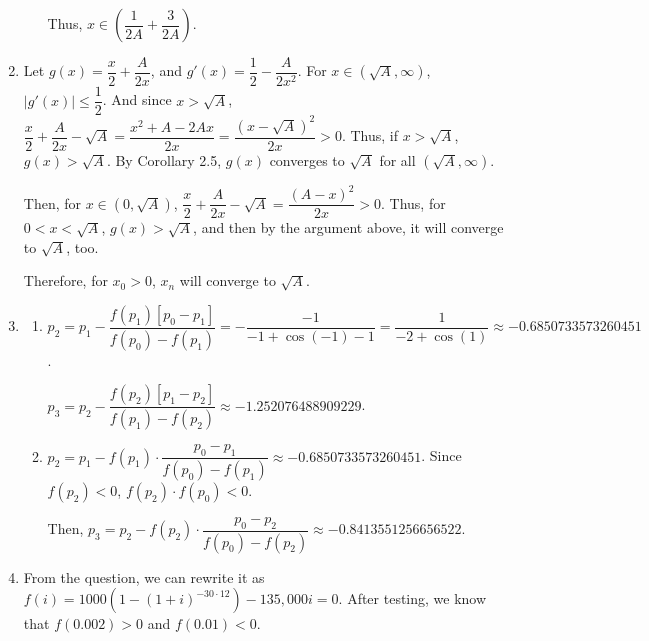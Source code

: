\documentclass[12pt]{article}
\begin{document}
\begin{enumerate}
\begin{enumerate}
        Thus, $x\in \left( \dfrac{1}{2A} + \dfrac{3}{2A}\right)$.
    \end{enumerate}

    \item Let $g(x) = \dfrac{x}{2} + \dfrac{A}{2x}$, and $g'(x) = \dfrac{1}{2} - \dfrac{A}{2x^2}$.
    For $x \in (\sqrt{A}, \infty)$, $|g'(x)| \leq \dfrac{1}{2}$.
    And since $x > \sqrt{A}$, $\dfrac{x}{2} + \dfrac{A}{2x} - \sqrt{A} = \dfrac{x^2 + A -2Ax}{2x} = \dfrac{(x-\sqrt{A})^2}{2x} > 0$.
    Thus, if $x>\sqrt{A}$, $g(x) > \sqrt{A}$.
    By Corollary 2.5, $g(x)$ converges to $\sqrt{A}$ for all $(\sqrt{A}, \infty)$.

    Then, for $x\in (0, \sqrt{A})$, $\dfrac{x}{2}+\dfrac{A}{2x} - \sqrt{A} = \dfrac{(A-x)^2}{2x} > 0$.
    Thus, for $0 < x < \sqrt{A}$, $g(x) > \sqrt{A}$, and then by the argument above, it will converge to $\sqrt{A}$, too.

    Therefore, for $x_0 > 0$, $x_n$ will converge to $\sqrt{A}$.

    \item \begin{enumerate}
        \item $p_2 = p_1 - \dfrac{f(p_1)[p_0-p_1]}{f(p_0) - f(p_1)} = -\dfrac{-1}{-1+\cos(-1)-1} = \dfrac{1}{-2+\cos(1)}\approx -0.6850733573260451$.
        
        $p_3 = p_2 - \dfrac{f(p_2)[p_1 - p_2]}{f(p_1) - f(p_2)} \approx -1.252076488909229$.

        \item $p_2 = p_1 - f(p_1)\cdot \dfrac{p_0 - p_1}{f(p_0) - f(p_1)} \approx -0.6850733573260451$.
        Since $f(p_2)< 0$, $f(p_2)\cdot f(p_0)<0$.

        Then, $p_3 = p_2 - f(p_2)\cdot \dfrac{p_0 - p_2}{f(p_0) - f(p_2)} \approx -0.8413551256656522$.
    \end{enumerate}

    \item From the question, we can rewrite it as $f(i) = 1000(1 - (1+i)^{-30\cdot 12}) - 135,000i = 0$.
    After testing, we know that $f(0.002) > 0$ and $f(0.01) < 0$.


\end{enumerate}
\end{document}
